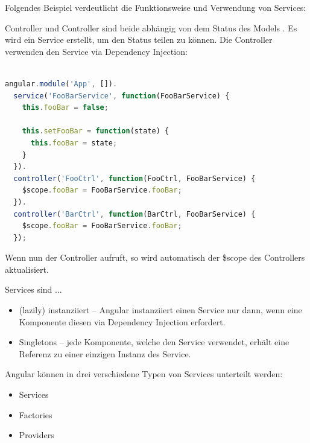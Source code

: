 Folgendes Beispiel verdeutlicht die Funktionsweise und Verwendung von Services:

Controller  und Controller  sind beide abhängig von dem Status des Models . Es wird ein Service  erstellt, um den Status teilen zu können. Die Controller verwenden den Service via Dependency Injection:

\begin{lstlisting}[language=JavaScript, caption=AngularJS - Services]

angular.module('App', []).
  service('FooBarService', function(FooBarService) {
    this.fooBar = false;

    this.setFooBar = function(state) {
      this.fooBar = state;
    }
  }).
  controller('FooCtrl', function(FooCtrl, FooBarService) {
    $scope.fooBar = FooBarService.fooBar;
  }).
  controller('BarCtrl', function(BarCtrl, FooBarService) {
    $scope.fooBar = FooBarService.fooBar;
  });

\end{lstlisting}

Wenn nun der  Controller  aufruft, so wird automatisch der \$scope des  Controllers aktualisiert.

Services sind \autocite[Services]{Angular:DevGuide}...
\begin{itemize}
  \item {} (lazily) instanziiert -- Angular instanziiert einen Service nur dann, wenn eine Komponente diesen via Dependency Injection erfordert.
  \item Singletons -- jede Komponente, welche den Service verwendet, erhält eine Referenz zu einer einzigen Instanz des Service.
\end{itemize}

\newpage
Angular  können in drei verschiedene Typen von Services unterteilt werden:
\begin{itemize}
  \item Services
  \item Factories
  \item Providers
\end{itemize}

